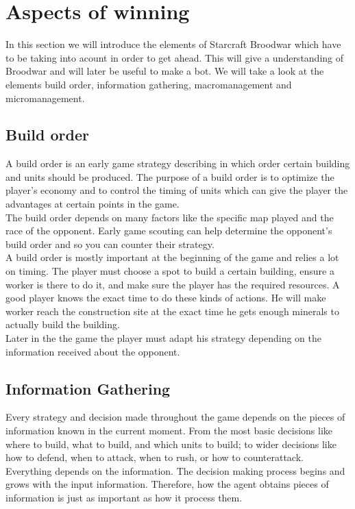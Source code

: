 \section{Aspects of winning}
In this section we will introduce the elements of Starcraft Broodwar which have to be taking into acount in order to get ahead. This will give a understanding 
of Broodwar and will later be useful to make a bot. We will take a look at the elements build order, information gathering, macromanagement and
micromanagement.

	\subsection{Build order}
		A build order is an early game strategy describing in which order certain building and units should be produced\cite{wiki_build_order}. 
		The purpose of a build order is to optimize the player's economy and to control the timing of units which can give 
		the player the advantages at certain points in the game.\\
		The build order depends on many factors like the specific map played and the race of the opponent. 
		Early game scouting can help determine the opponent's build order and so you can counter their strategy.\\
		
		A build order is mostly important at the beginning of the game and relies a lot on timing. 
		The player must choose a spot to build a certain building, ensure a worker is there to do it, 
		and make sure the player has the required resources. 
		A good player knows the exact time to do these kinds of actions. 
		He will make worker reach the construction site at the exact time he gets enough minerals to actually build the building.\\
		
		Later in the the game the player must adapt his strategy depending on the information received about the opponent.
	
	\subsection{Information Gathering}
		Every strategy and decision made throughout the game depends on the pieces of information 
		known in the current moment. From the most basic decisions like where to build, what to build, and
		which units to build; to wider decisions like how to defend, when to attack, when to rush, or how to counterattack.
		Everything depends on the information. The decision making process begins and grows with the input information.
		Therefore, how the agent obtains pieces of information is just as important 
		as how it process them. 
	
